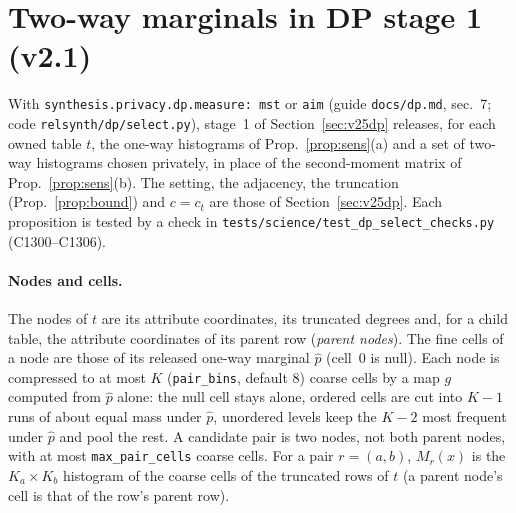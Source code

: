 \section{Two-way marginals in DP stage 1 (v2.1)}\label{sec:v26dpsel}
\setcounter{savedpropdpsel}{\value{proposition}}
With \texttt{synthesis.privacy.dp.measure: mst} or \texttt{aim} (guide \texttt{docs/dp.md}, sec.~7; code \texttt{relsynth/dp/select.py}), stage~1 of Section~\ref{sec:v25dp} releases, for each owned table $t$, the one-way histograms of Prop.~\ref{prop:sens}(a) and a set of two-way histograms chosen privately, in place of the second-moment matrix of Prop.~\ref{prop:sens}(b). The setting, the adjacency, the truncation (Prop.~\ref{prop:bound}) and $c=c_t$ are those of Section~\ref{sec:v25dp}. Each proposition is tested by a check in \texttt{tests/science/test\_dp\_select\_checks.py} (C1300--C1306).

\paragraph{Nodes and cells.} The nodes of $t$ are its attribute coordinates, its truncated degrees and, for a child table, the attribute coordinates of its parent row (\emph{parent nodes}). The fine cells of a node are those of its released one-way marginal $\hat p$ (cell~0 is null). Each node is compressed to at most $K$ (\texttt{pair\_bins}, default 8) coarse cells by a map $g$ computed from $\hat p$ alone: the null cell stays alone, ordered cells are cut into $K-1$ runs of about equal mass under $\hat p$, unordered levels keep the $K-2$ most frequent under $\hat p$ and pool the rest. A candidate pair is two nodes, not both parent nodes, with at most \texttt{max\_pair\_cells} coarse cells. For a pair $r=(a,b)$, $M_r(x)$ is the $K_a\times K_b$ histogram of the coarse cells of the truncated rows of $t$ (a parent node's cell is that of the row's parent row).

